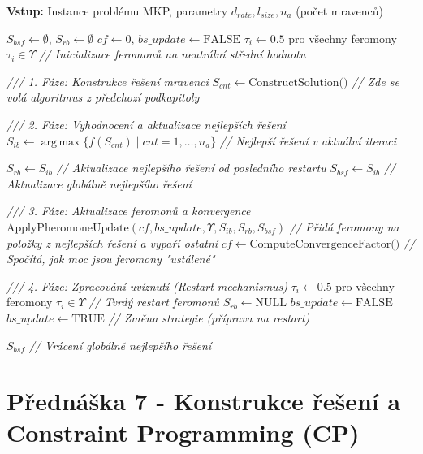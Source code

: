 \documentclass[12pt,a4paper]{article}
\theoremstyle{definition}
\begin{document}
\begin{algorithm}[H]
\caption{ACO pro MKP (MAX-MIN Ant System)}
\textbf{Vstup:} Instance problému MKP, parametry $d_{rate}, l_{size}, n_a$ (počet mravenců)
\begin{algorithmic}[1]
\STATE $S_{bsf} \gets \emptyset$, $S_{rb} \gets \emptyset$
\STATE $cf \gets 0$, $bs\_update \gets \text{FALSE}$
\STATE $\tau_i \gets 0.5$ pro všechny feromony $\tau_i \in \Upsilon$ \textit{// Inicializace feromonů na neutrální střední hodnotu}

    \STATE \textit{/// 1. Fáze: Konstrukce řešení mravenci}
        \STATE $S_{cnt} \gets \text{ConstructSolution()}$ \textit{// Zde se volá algoritmus z předchozí podkapitoly}
    \ENDFOR
    
    \STATE \textit{/// 2. Fáze: Vyhodnocení a aktualizace nejlepších řešení}
    \STATE $S_{ib} \gets \operatorname{arg\,max} \{f(S_{cnt}) \mid cnt = 1, \dots, n_a\}$ \textit{// Nejlepší řešení v aktuální iteraci}
    
        \STATE $S_{rb} \gets S_{ib}$ \textit{// Aktualizace nejlepšího řešení od posledního restartu}
    \ENDIF
        \STATE $S_{bsf} \gets S_{ib}$ \textit{// Aktualizace globálně nejlepšího řešení}
    \ENDIF
    
    \STATE \textit{/// 3. Fáze: Aktualizace feromonů a konvergence}
    \STATE $\text{ApplyPheromoneUpdate}(cf, bs\_update, \Upsilon, S_{ib}, S_{rb}, S_{bsf})$ \textit{// Přidá feromony na položky z nejlepších řešení a vypaří ostatní}
    \STATE $cf \gets \text{ComputeConvergenceFactor()}$ \textit{// Spočítá, jak moc jsou feromony "ustálené"}
    
    \STATE \textit{/// 4. Fáze: Zpracování uvíznutí (Restart mechanismus)}
            \STATE $\tau_i \gets 0.5$ pro všechny feromony $\tau_i \in \Upsilon$ \textit{// Tvrdý restart feromonů}
            \STATE $S_{rb} \gets \text{NULL}$
            \STATE $bs\_update \gets \text{FALSE}$
        \ELSE
            \STATE $bs\_update \gets \text{TRUE}$ \textit{// Změna strategie (příprava na restart)}
        \ENDIF
    \ENDIF
\ENDWHILE

\RETURN $S_{bsf}$ \textit{// Vrácení globálně nejlepšího řešení}
\end{algorithmic}
\end{algorithm}

\section{Přednáška 7 - Konstrukce řešení a Constraint Programming (CP)}
\end{document}

